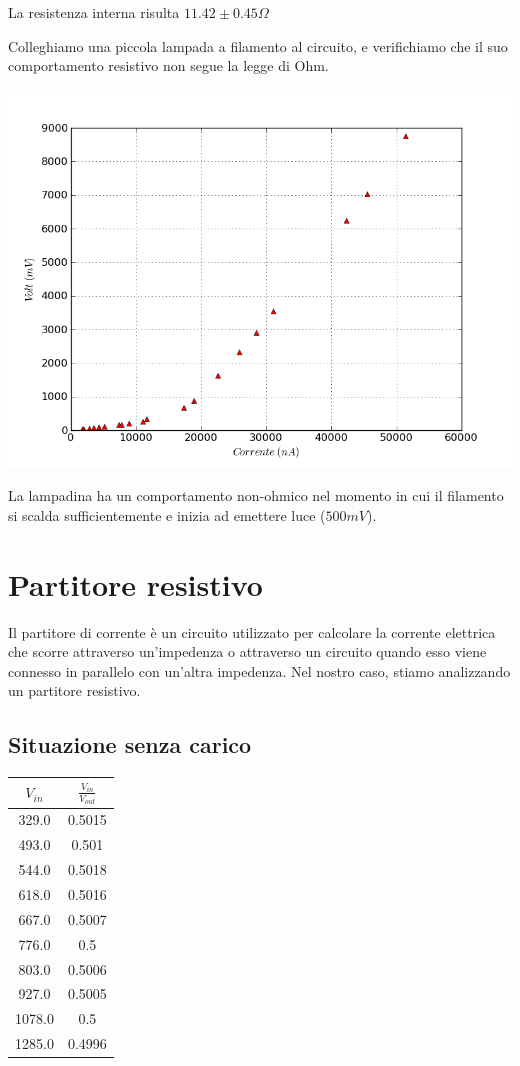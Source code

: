 La resistenza interna risulta $11.42 \pm 0.45 \Omega$

Colleghiamo una piccola lampada a filamento al circuito, e verifichiamo che il suo comportamento resistivo non segue la legge di Ohm. 

\includegraphics[scale=0.75]{grafici/C1/lampa.png}

La lampadina ha un comportamento non-ohmico nel momento in cui il filamento si scalda sufficientemente e inizia ad emettere luce ($500mV$).


\section{Partitore resistivo}
Il partitore di corrente è un circuito utilizzato per calcolare la corrente elettrica che scorre attraverso un'impedenza o attraverso un circuito quando esso viene connesso in parallelo con un'altra impedenza.
Nel nostro caso, stiamo analizzando un partitore resistivo. 

\subsection{Situazione senza carico}
\begin{center}
\begin{tabular}{*{2}{c}}
$V_{in}$ & $\frac{V_{in}}{V_{out}}$\\
\midrule
329.0 & 0.5015 \\
493.0 & 0.501 \\
544.0 & 0.5018 \\
618.0 & 0.5016 \\
667.0 & 0.5007 \\
776.0 & 0.5 \\
803.0 & 0.5006 \\
927.0 & 0.5005 \\
1078.0 & 0.5 \\
1285.0 & 0.4996 \\
\end{tabular}

\end{center}


